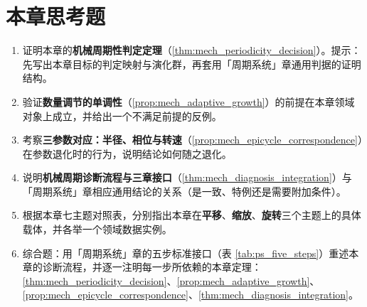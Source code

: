 \section*{本章思考题}

\begin{enumerate}[leftmargin=3em, label=\textbf{题 \arabic*}]
    \item 证明本章的\textbf{机械周期性判定定理}（\ref{thm:mech_periodicity_decision}）。提示：先写出本章目标的判定映射与演化群，再套用「周期系统」章通用判据的证明结构。

    \item 验证\textbf{数量调节的单调性}（\ref{prop:mech_adaptive_growth}）的前提在本章领域对象上成立，并给出一个不满足前提的反例。

    \item 考察\textbf{三参数对应：半径、相位与转速}（\ref{prop:mech_epicycle_correspondence}）在参数退化时的行为，说明结论如何随之退化。

    \item 说明\textbf{机械周期诊断流程与三章接口}（\ref{thm:mech_diagnosis_integration}）与「周期系统」章相应通用结论的关系（是一致、特例还是需要附加条件）。

    \item 根据本章七主题对照表，分别指出本章在\textbf{平移}、\textbf{缩放}、\textbf{旋转}三个主题上的具体载体，并各举一个领域数据实例。

    \item 综合题：用「周期系统」章的五步标准接口（表 \ref{tab:ps_five_steps}）重述本章的诊断流程，并逐一注明每一步所依赖的本章定理：\ref{thm:mech_periodicity_decision}、\ref{prop:mech_adaptive_growth}、\ref{prop:mech_epicycle_correspondence}、\ref{thm:mech_diagnosis_integration}。
\end{enumerate}


